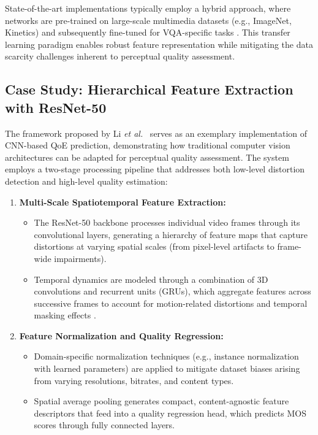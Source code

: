 State-of-the-art implementations typically employ a hybrid approach, where networks are pre-trained on large-scale multimedia datasets (e.g., ImageNet, Kinetics) and subsequently fine-tuned for VQA-specific tasks \cite{li2023unified}. This transfer learning paradigm enables robust feature representation while mitigating the data scarcity challenges inherent to perceptual quality assessment.

\subsection{Case Study: Hierarchical Feature Extraction with ResNet-50}  
The framework proposed by Li \textit{et al.}~\cite{li2023unified} serves as an exemplary implementation of CNN-based QoE prediction, demonstrating how traditional computer vision architectures can be adapted for perceptual quality assessment. The system employs a two-stage processing pipeline that addresses both low-level distortion detection and high-level quality estimation:

\begin{enumerate}  
    \item \textbf{Multi-Scale Spatiotemporal Feature Extraction:}  
    \begin{itemize}  
        \item The ResNet-50 backbone processes individual video frames through its convolutional layers, generating a hierarchy of feature maps that capture distortions at varying spatial scales (from pixel-level artifacts to frame-wide impairments).
        \item Temporal dynamics are modeled through a combination of 3D convolutions and recurrent units (GRUs), which aggregate features across successive frames to account for motion-related distortions and temporal masking effects \cite{lee2021video}.
    \end{itemize}  
    
    \item \textbf{Feature Normalization and Quality Regression:}  
    \begin{itemize}  
        \item Domain-specific normalization techniques (e.g., instance normalization with learned parameters) are applied to mitigate dataset biases arising from varying resolutions, bitrates, and content types.
        \item Spatial average pooling generates compact, content-agnostic feature descriptors that feed into a quality regression head, which predicts MOS scores through fully connected layers.
    \end{itemize}  
\end{enumerate}  

